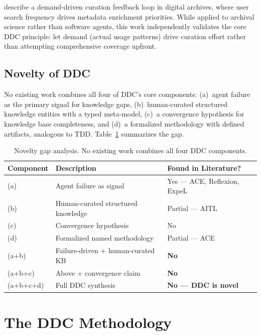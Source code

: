 \documentclass[11pt,a4paper]{article}
\begin{document}
\citet{karidi2025kgarchives} describe a demand-driven curation feedback loop in digital archives, where user search frequency drives metadata enrichment priorities. While applied to archival science rather than software agents, this work independently validates the core DDC principle: let demand (actual usage patterns) drive curation effort rather than attempting comprehensive coverage upfront.

\subsection{Novelty of DDC}

No existing work combines all four of DDC's core components: (a)~agent failure as the primary signal for knowledge gaps, (b)~human-curated structured knowledge entities with a typed meta-model, (c)~a convergence hypothesis for knowledge base completeness, and (d)~a formalized methodology with defined artifacts, analogous to TDD. Table~\ref{tab:novelty} summarizes the gap.

\begin{table}[h]
\centering
\caption{Novelty gap analysis. No existing work combines all four DDC components.}
\label{tab:novelty}
\begin{tabular}{@{}lll@{}}
\toprule
\textbf{Component} & \textbf{Description} & \textbf{Found in Literature?} \\
\midrule
(a) & Agent failure as signal & Yes --- ACE, Reflexion, ExpeL \\
(b) & Human-curated structured knowledge & Partial --- AITL \\
(c) & Convergence hypothesis & No \\
(d) & Formalized named methodology & Partial --- ACE \\
\midrule
(a+b) & Failure-driven + human-curated KB & \textbf{No} \\
(a+b+c) & Above + convergence claim & \textbf{No} \\
(a+b+c+d) & Full DDC synthesis & \textbf{No --- DDC is novel} \\
\bottomrule
\end{tabular}
\end{table}

\section{The DDC Methodology}
\label{sec:methodology}
\end{document}
